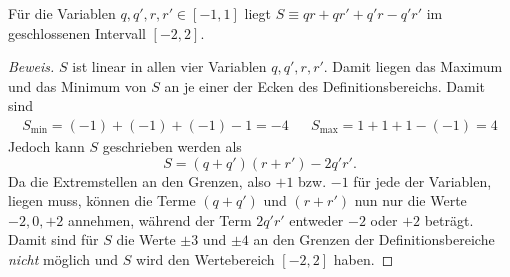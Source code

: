 \begin{refsection}
\begin{hilfssatz}
    F\"ur die Variablen $q, q', r, r' \in [-1,1]$ liegt 
    $S \equiv qr + qr' + q'r - q'r'$ im geschlossenen Intervall $[-2,2]$.
    \label{hilfssatz:bell:interval}
\end{hilfssatz}
\begin{proof}[Beweis]
    $S$ ist linear in allen vier Variablen $q, q', r, r'$.
    Damit liegen das Maximum und das Minimum von $S$ an je einer der Ecken des
    Definitionsbereichs. Damit sind
    \begin{align*}
        S_{\text{min}} = (-1) + (-1) + (-1) - 1 = -4 &&
        S_ {\text{max}} = 1 + 1 + 1 - (-1) = 4
    \end{align*}
    Jedoch kann $S$ geschrieben werden als
    \[
        S = (q + q')(r + r') - 2 q'r'.
    \]
    Da die Extremstellen an den Grenzen, also $+1$ bzw. $-1$ f\"ur jede der
    Variablen, liegen muss, k\"onnen die Terme $(q+q')$ und $(r+r')$ nun nur
    die Werte $-2, 0, +2$ annehmen, w\"ahrend der Term $2q'r'$ 
    entweder $-2$ oder $+2$ betr\"agt.
    Damit sind f\"ur $S$ die Werte $\pm 3$ und $\pm 4$ an den Grenzen der
    Definitionsbereiche \emph{nicht} m\"oglich und $S$ wird den Wertebereich
    $[-2,2]$ haben.
\end{proof}


\end{refsection}
